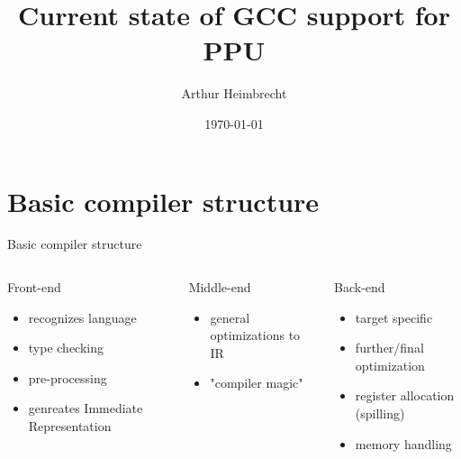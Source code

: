 \documentclass[10pt]{beamer}
\title{Current state of GCC support for PPU}
\author{Arthur Heimbrecht}
\date{\today}
\begin{document}
\begin{frame}
\titlepage
\end{frame}

\begin{frame}
\tableofcontents
\end{frame}

\section{Basic compiler structure}
\begin{frame}{Basic compiler structure}
	\begin{columns}
		\begin{column}{0.25\textwidth}
      		\begin{block}{Front-end}
       			\begin{itemize}
       				\item recognizes language
       				\item type checking
       				\item pre-processing
       				\item genreates Immediate Representation
       			\end{itemize}
      		\end{block}
    	\end{column}
    	\begin{column}{0.25\textwidth}
      		\begin{block}{Middle-end}
       			\begin{itemize}
       				\item general optimizations to IR
       				\item "compiler magic"
       			\end{itemize}
      		\end{block}
    	\end{column}
    	\begin{column}{0.25\textwidth}
      		\begin{block}{Back-end}
       			\begin{itemize}
       				\item target specific
       				\item further/final optimization
       				\item register allocation (spilling)
       				\item memory handling
       			\end{itemize}
      		\end{block}
    	\end{column}
    \end{columns}
\end{frame}
\end{document}
